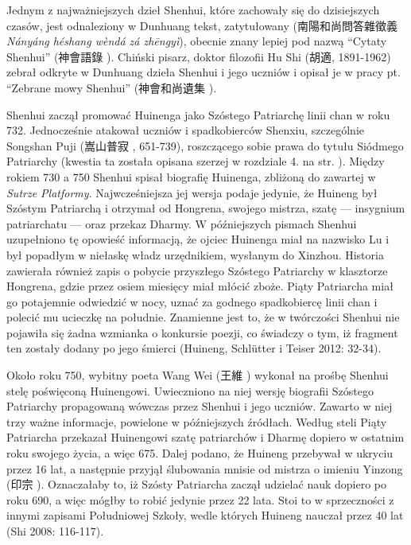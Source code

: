 Jednym z najważniejszych dzieł Shenhui, które zachowały się do dzisiejszych czasów, jest odnaleziony w Dunhuang tekst, zatytułowany  (南陽和尚問答雜徵義 \textit{Nányáng héshang wèndá zá zhēngyì}), obecnie znany lepiej pod nazwą ``Cytaty Shenhui'' (神會語錄 ).
Chiński pisarz, doktor filozofii Hu Shi (胡適, 1891-1962) zebrał odkryte w Dunhuang dzieła Shenhui i jego uczniów i opisał je w pracy pt. ``Zebrane mowy Shenhui'' (神會和尚遺集 ).

Shenhui zaczął promować Huinenga jako Szóstego Patriarchę linii chan w roku 732.
Jednocześnie atakował uczniów i spadkobierców Shenxiu, szczególnie Songshan Puji (嵩山普寂 , 651-739), roszczącego sobie prawa do tytułu Siódmego Patriarchy (kwestia ta została opisana szerzej w rozdziale 4. na str. \pageref{ch:chapter_four}).
Między rokiem 730 a 750 Shenhui spisał biografię Huinenga, zbliżoną do zawartej w \textit{Sutrze Platformy}.
Najwcześniejsza jej wersja podaje jedynie, że Huineng był Szóstym Patriarchą i otrzymał od Hongrena, swojego mistrza, szatę --- insygnium patriarchatu --- oraz przekaz Dharmy.
W późniejszych pismach Shenhui uzupełniono tę opowieść informacją, że ojciec Huinenga miał na nazwisko Lu i był popadłym w niełaskę władz urzędnikiem, wysłanym do Xinzhou.
Historia zawierała również zapis o pobycie przyszłego Szóstego Patriarchy w klasztorze Hongrena, gdzie przez osiem miesięcy miał młócić zboże.
Piąty Patriarcha miał go potajemnie odwiedzić w nocy, uznać za godnego spadkobiercę linii chan i polecić mu ucieczkę na południe.
Znamienne jest to, że w twórczości Shenhui nie pojawiła się żadna wzmianka o konkursie poezji, co świadczy o tym, iż fragment ten zostały dodany po jego śmierci
(Huineng, Schlütter i Teiser 2012: 32-34).

Około roku 750, wybitny poeta Wang Wei (王維 ) wykonał na prośbę Shenhui stelę poświęconą Huinengowi.
Uwieczniono na niej wersję biografii Szóstego Patriarchy propagowaną wówczas przez Shenhui i jego uczniów.
Zawarto w niej trzy ważne informacje, powielone w późniejszych źródłach.
Według steli Piąty Patriarcha przekazał Huinengowi szatę patriarchów i Dharmę dopiero w ostatnim roku swojego życia, a więc 675. %
Dalej podano, że Huineng przebywał w ukryciu przez 16 lat, a następnie przyjął ślubowania mnisie od mistrza o imieniu Yinzong (印宗 ).
Oznaczałaby to, iż Szósty Patriarcha zaczął udzielać nauk dopiero po roku 690, a więc mógłby to robić jedynie przez 22 lata.
Stoi to w sprzeczności z innymi zapisami Południowej Szkoły, wedle których Huineng nauczał przez 40 lat
(Shi 2008: 116-117).

